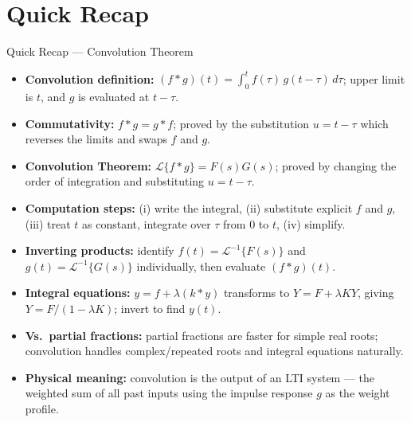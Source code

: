 \documentclass[12pt,a4paper]{article}
\begin{document}
\section{Quick Recap}

\begin{learnbox}{Quick Recap --- Convolution Theorem}
\begin{itemize}[leftmargin=*]
\item \textbf{Convolution definition:}
      $(f*g)(t) = \int_0^t f(\tau)\,g(t-\tau)\,d\tau$;
      upper limit is $t$, and $g$ is evaluated at $t-\tau$.
\item \textbf{Commutativity:} $f*g = g*f$; proved by the substitution $u = t-\tau$
      which reverses the limits and swaps $f$ and $g$.
\item \textbf{Convolution Theorem:} $\mathcal{L}\{f*g\} = F(s)G(s)$;
      proved by changing the order of integration and substituting $u = t-\tau$.
\item \textbf{Computation steps:} (i) write the integral, (ii) substitute explicit $f$ and $g$,
      (iii) treat $t$ as constant, integrate over $\tau$ from 0 to $t$, (iv) simplify.
\item \textbf{Inverting products:} identify $f(t) = \mathcal{L}^{-1}\{F(s)\}$ and
      $g(t) = \mathcal{L}^{-1}\{G(s)\}$ individually, then evaluate $(f*g)(t)$.
\item \textbf{Integral equations:} $y = f + \lambda(k*y)$ transforms to $Y = F + \lambda KY$,
      giving $Y = F/(1-\lambda K)$; invert to find $y(t)$.
\item \textbf{Vs.\ partial fractions:} partial fractions are faster for simple real roots;
      convolution handles complex/repeated roots and integral equations naturally.
\item \textbf{Physical meaning:} convolution is the output of an LTI system ---
      the weighted sum of all past inputs using the impulse response $g$ as the weight profile.
\end{itemize}
\end{learnbox}
\end{document}
